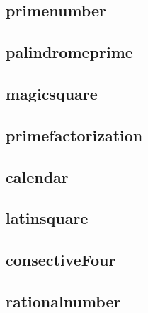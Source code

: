     \subsection{primenumber}
        
    \subsection{palindromeprime}
        
    \subsection{magicsquare}
        
    \subsection{primefactorization}
        
    \subsection{calendar}
        
    \subsection{latinsquare}
        
    \subsection{consectiveFour}
        
    \subsection{rationalnumber}
        
        